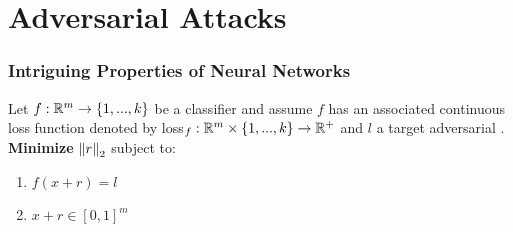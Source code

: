 \section{Adversarial Attacks}

\label{Chapter2} %


\begin{frame}
\frametitle{Intriguing Properties of Neural Networks \cite{szegedy2013}}
Let $f : \mathbb{R}^m \to \{1,...,k\}$ be a classifier and assume $f$ has an associated continuous loss function denoted by loss$_f : \mathbb{R}^m \times \{1,...,k\} \to \mathbb{R}^+$ and $l$ a target adversarial . \\
\textbf{ Minimize} $\left\lVert r \right\rVert_2$ subject to:
\begin{enumerate}[1.]
\item $f(x + r) = l$
\item $x + r \in [0,1]^m$
\end{enumerate}


\end{frame}
